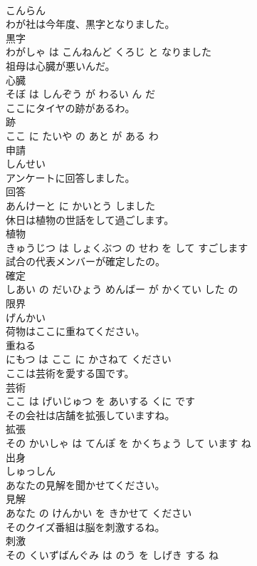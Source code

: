 \documentclass[8pt]{extreport}
\begin{document}
\begin{CJK}{UTF8}{min}
\\	こんらん		
\\	わが社は今年度、黒字となりました。	
\\	黒字 
\\	わがしゃ は こんねんど くろじ と なりました		
\\	祖母は心臓が悪いんだ。	
\\	心臓 
\\	そぼ は しんぞう が わるい ん だ		
\\	ここにタイヤの跡があるわ。	
\\	跡 
\\	ここ に たいや の あと が ある わ		
\\	申請	
\\	しんせい		
\\	アンケートに回答しました。	
\\	回答 
\\	あんけーと に かいとう しました		
\\	休日は植物の世話をして過ごします。	
\\	植物 
\\	きゅうじつ は しょくぶつ の せわ を して すごします		
\\	試合の代表メンバーが確定したの。	
\\	確定 
\\	しあい の だいひょう めんばー が かくてい した の		
\\	限界	
\\	げんかい		
\\	荷物はここに重ねてください。	
\\	重ねる 
\\	にもつ は ここ に かさねて ください		
\\	ここは芸術を愛する国です。	
\\	芸術 
\\	ここ は げいじゅつ を あいする くに です		
\\	その会社は店舗を拡張していますね。	
\\	拡張 
\\	その かいしゃ は てんぽ を かくちょう して います ね		
\\	出身	
\\	しゅっしん		
\\	あなたの見解を聞かせてください。	
\\	見解 
\\	あなた の けんかい を きかせて ください		
\\	そのクイズ番組は脳を刺激するね。	
\\	刺激 
\\	その くいずばんぐみ は のう を しげき する ね		

\end{CJK}
\end{document}
